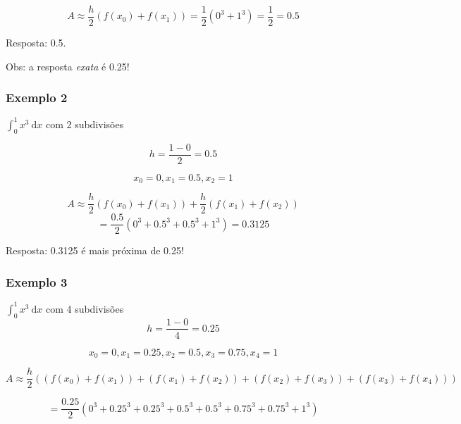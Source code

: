 \documentclass[a4paper]{article}
\newcommand{\ud}{\mathrm{\ d}}
\begin{document}
\begin{displaymath}
  A \approx \frac{h}{2}(f(x_0) + f(x_1)) = \frac{1}{2}(0^3 + 1^3) =
  \frac{1}{2} = 0.5
\end{displaymath}

Resposta: 0.5.

Obs: a resposta {\em exata} é 0.25!

\subsubsection*{Exemplo 2}

$\int_0^1 x^3 \ud x$ com 2 subdivisões

\begin{displaymath}
  h = \frac{1-0}{2} = 0.5
\end{displaymath}

\begin{displaymath}
  x_0 = 0, x_1=0.5, x_2=1
\end{displaymath}

\begin{displaymath}
  A \approx \frac{h}{2}(f(x_0) + f(x_1)) + \frac{h}{2}(f(x_1) + f(x_2))
\end{displaymath}
\begin{displaymath}
  = \frac{0.5}{2}(0^3 + 0.5^3 + 0.5^3 + 1^3) = 0.3125
\end{displaymath}

Resposta: 0.3125 é mais próxima de 0.25!

\subsubsection*{Exemplo 3}
$\int_0^1 x^3 \ud x$ com 4 subdivisões
\begin{displaymath}
  h = \frac{1-0}{4} = 0.25
\end{displaymath}

\begin{displaymath}
  x_0 = 0, x_1=0.25, x_2=0.5, x_3=0.75, x_4=1
\end{displaymath}

\begin{displaymath}
  A \approx \frac{h}{2} ((f(x_0) + f(x_1)) + (f(x_1) +
  f(x_2)) + (f(x_2) + f(x_3)) + (f(x_3) + f(x_4)) )
\end{displaymath}

\begin{displaymath}
  = \frac{0.25}{2}(0^3 + 0.25^3 + 0.25^3 + 0.5^3 + 0.5^3 + 0.75^3 +
  0.75^3 + 1^3)
\end{displaymath}
\end{document}
